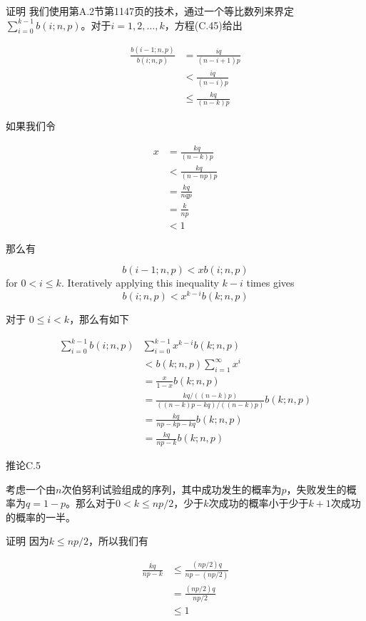 \documentclass[lang=cn,newtx,10pt,scheme=chinese]{elegantbook}
\begin{document}
证明 我们使用第A.2节第1147页的技术，通过一个等比数列来界定$\sum_{i=0}^{k-1} b(i ; n, p)$。对于$i=1,2, \ldots, k$，方程(C.45)给出

$$
\begin{aligned}
\frac{b(i-1 ; n, p)}{b(i ; n, p)} & =\frac{i q}{(n-i+1) p} \\
& <\frac{i q}{(n-i) p} \\
& \leq \frac{k q}{(n-k) p}
\end{aligned}
$$

如果我们令

$$
\begin{aligned}
x & =\frac{k q}{(n-k) p} \\
& <\frac{k q}{(n-n p) p} \\
& =\frac{k q}{n q p} \\
& =\frac{k}{n p} \\
& <1
\end{aligned}
$$

那么有

$$
b(i-1 ; n, p)<x b(i ; n, p)
$$
for $0<i \leq k$. Iteratively applying this inequality $k-i$ times gives
$$
b(i ; n, p)<x^{k-i} b(k ; n, p)
$$

对于 $0 \leq i<k$，那么有如下

$$
\begin{aligned}
\sum_{i=0}^{k-1} b(i ; n, p) & \sum_{i=0}^{k-1} x^{k-i} b(k ; n, p) \\
& <b(k ; n, p) \sum_{i=1}^{\infty} x^i \\
& =\frac{x}{1-x} b(k ; n, p) \\
& =\frac{k q /((n-k) p)}{((n-k) p-k q) /((n-k) p)} b(k ; n, p) \\
& =\frac{k q}{n p-k p-k q} b(k ; n, p) \\
& =\frac{k q}{n p-k} b(k ; n, p)
\end{aligned}
$$

推论C.5

考虑一个由$n$次伯努利试验组成的序列，其中成功发生的概率为$p$，失败发生的概率为$q=1-p$。那么对于$0<k \leq n p / 2$，少于$k$次成功的概率小于少于$k+1$次成功的概率的一半。

证明 因为$k \leq n p / 2$，所以我们有

$$
\begin{aligned}
\frac{k q}{n p-k} & \leq \frac{(n p / 2) q}{n p-(n p / 2)} \\
& =\frac{(n p / 2) q}{n p / 2} \\
& \leq 1
\end{aligned}
$$
\end{document}
